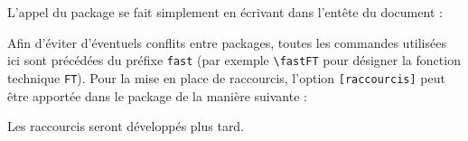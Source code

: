 		L'appel du package se fait simplement en écrivant dans l'entête du document :
\begin{code}
\usepackage{fast-diagram}
\end{code}
		Afin d'éviter d'éventuels conflits entre packages, toutes les commandes utilisées ici sont précédées du préfixe {\color{blue}\verb'fast'}
		(par exemple {\color{blue}\verb'\fastFT'} pour désigner la fonction technique \verb'FT').
		Pour la mise en place de raccourcis, l'option {\color{blue}\verb'[raccourcis]'} peut être apportée dans le package de la manière suivante :
\begin{code}
\usepackage[raccourcis]{fast-diagram}
\end{code}
		Les raccourcis seront développés plus tard.